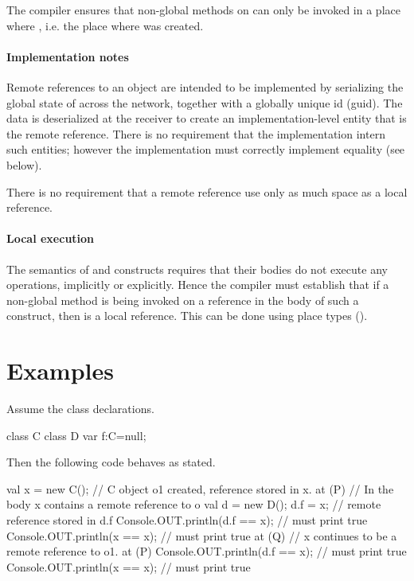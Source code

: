 The \Xten{} compiler ensures that non-global methods on  can
only be invoked in a place where , i.e. the place
where  was created.

\paragraph{Implementation notes}
Remote references to an object  are intended to be implemented
by serializing the global state of  across the network,
together with a globally unique id (guid). The data is deserialized at
the receiver to create an implementation-level entity that is the
remote reference. There is no requirement that the implementation
intern such entities; however the implementation must correctly
implement equality (see below).

There is no requirement that a remote reference use only as much space as a local reference.

  
\paragraph{Local execution}
 The semantics of  and  constructs requires that their
 bodies do not execute any  operations, implicitly or
 explicitly. Hence the compiler must establish that if a non-global method
 is being invoked on a reference  in the body of such a construct,
 then  is a local reference. This can be done using place types ().

  
\section{Examples}
Assume the class declarations. 

\begin{xten}
class C { } 
class D {
   var f:C=null;
}
\end{xten}

Then the following code behaves as stated.
\begin{xten}

val x = new C(); 
// C object o1 created, reference stored in x. 
at (P) { 
      // In the body x contains a remote reference to o
      val d = new D();
      d.f  = x; // remote reference stored in d.f
      Console.OUT.println(d.f == x);        // must print true
      Console.OUT.println(x == x);          // must print true
      at (Q) { 
         // x continues to be a remote reference to o1.
         at (P) {  
             Console.OUT.println(d.f == x);   // must print true
             Console.OUT.println(x == x);   // must print true
         }
      }
}
\end{xten}
  
